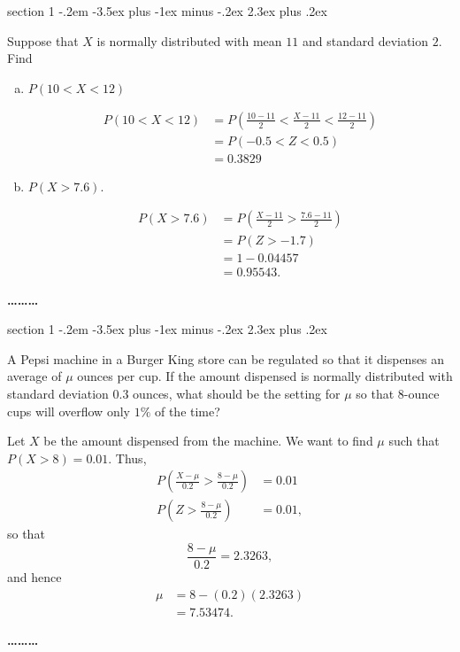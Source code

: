\documentclass[11pt]{exam}
\makeatletter
\newenvironment{problem}{\@startsection
       {section}
       {1}
       {-.2em}
       {-3.5ex plus -1ex minus -.2ex}
       {2.3ex plus .2ex}
       {\pagebreak[3]%
       \large\bf\noindent{Problem }
       }
       }
       {%
       \begin{center}\large\bf \ldots\ldots\ldots\end{center}}
\makeatother
\begin{document}
\begin{problem}{}

Suppose that $X$ is normally distributed with mean $11$ and standard
deviation $2$. Find

\begin{enumerate}[(a)]

  \item $P(10 < X < 12)$

\begin{solution}
\begin{align*}
  P(10 < X < 12)
    &= P\left(\frac{10-11}{2} < \frac{X - 11}{2} < \frac{12 - 11}{2}\right) \\
    &= P(-0.5 < Z < 0.5) \\
    &= 0.3829 
\end{align*}

\end{solution}

  \item $P(X > 7.6)$.

\begin{solution}
\begin{align*}
  P(X > 7.6)
    &= P\left(\frac{X - 11}{2} > \frac{7.6 - 11}{2}\right) \\
    &= P(Z > -1.7) \\
    &= 1 - 0.04457 \\
    &= 0.95543.
\end{align*}
\end{solution}

\end{enumerate}

\end{problem}



\begin{problem}{}

A Pepsi machine in a Burger King store can be regulated so that it dispenses
an average of $\mu$ ounces per cup. If the amount dispensed is normally
distributed with standard deviation $0.3$ ounces, what should be the setting
for $\mu$ so that $8$-ounce cups will overflow only $1\%$ of the time?

\begin{solution}
Let $X$ be the amount dispensed from the machine.  We want to find $\mu$ such
that $P(X > 8) = 0.01$.  Thus,
\begin{align*}
  P\left(\frac{X - \mu}{0.2} > \frac{8 - \mu}{0.2}\right) &= 0.01 \\
  P\left(Z > \frac{8 - \mu}{0.2}\right) &= 0.01,
\end{align*}
so that
\[
  \frac{8 - \mu}{0.2} = 2.3263,
\]
and hence
\begin{align*}
 \mu &= 8 - (0.2) (2.3263) \\
     &= 7.53474.
\end{align*}
\end{solution}

\end{problem}
\end{document}

